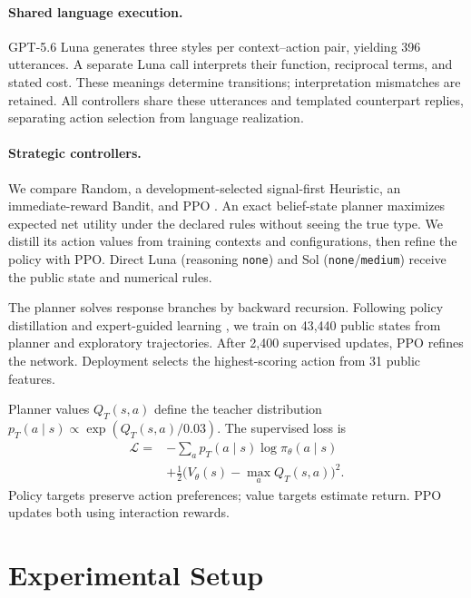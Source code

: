\paragraph{Shared language execution.}

GPT-5.6 Luna generates three styles per context--action pair, yielding 396 utterances. A separate Luna call interprets their function, reciprocal terms, and stated cost. These meanings determine transitions; interpretation mismatches are retained. All controllers share these utterances and templated counterpart replies, separating action selection from language realization.

\paragraph{Strategic controllers.}

We compare Random, a development-selected signal-first Heuristic, an immediate-reward Bandit, and PPO \citep{schulman2017ppo}. An exact belief-state planner maximizes expected net utility under the declared rules without seeing the true type. We distill its action values from training contexts and configurations, then refine the policy with PPO. Direct Luna (reasoning \texttt{none}) and Sol (\texttt{none}/\texttt{medium}) receive the public state and numerical rules.

The planner solves response branches by backward recursion. Following policy distillation and expert-guided learning \citep{rusu2016distillation,anthony2017expert}, we train on 43,440 public states from planner and exploratory trajectories. After 2,400 supervised updates, PPO refines the network. Deployment selects the highest-scoring action from 31 public features.

Planner values $Q_T(s,a)$ define the teacher distribution $p_T(a\mid s)\propto\exp(Q_T(s,a)/0.03)$. The supervised loss is
\begin{equation}
\begin{aligned}
\mathcal{L}={}&-\sum_a p_T(a\mid s)\log\pi_\theta(a\mid s)\\
&+\tfrac12\bigl(V_\theta(s)-\max_a Q_T(s,a)\bigr)^2.
\end{aligned}
\end{equation}
Policy targets preserve action preferences; value targets estimate return. PPO updates both using interaction rewards.

\section{Experimental Setup}

